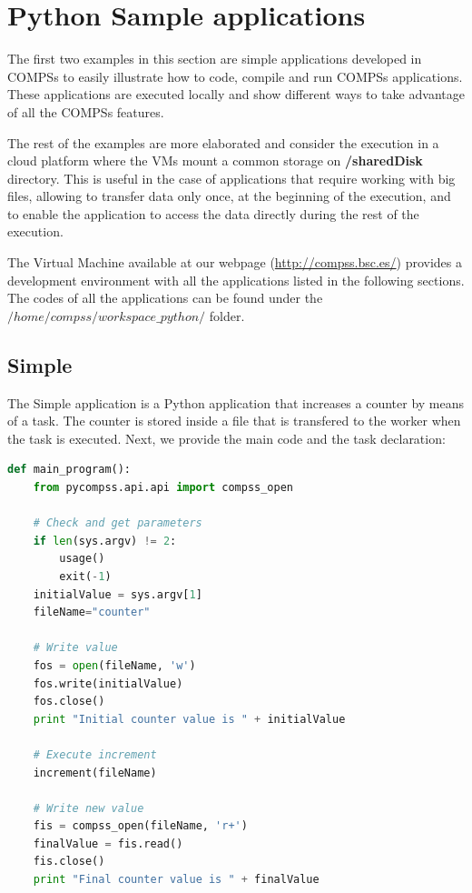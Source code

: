 \section{Python Sample applications}
\label{sec:PythonSampleApps}

The first two examples in this section are simple applications developed in COMPSs to easily illustrate how to code,
compile and run COMPSs applications. These applications are executed locally and show different ways to take advantage
of all the COMPSs features. 

The rest of the examples are more elaborated and consider the execution in a cloud platform where the VMs mount a common 
storage on \textbf{/sharedDisk} directory. This is useful in the case of applications that require working 
with big files, allowing to transfer data only once, at the beginning of the execution, and to enable 
the application to access the data directly during the rest of the execution.

The Virtual Machine available at our webpage (\url{http://compss.bsc.es/}) provides a development environment with
all the applications listed in the following sections. The codes of all the applications can be found under the 
$/home/compss/workspace\_python/$ folder. 

\subsection{Simple}
The Simple application is a Python application that increases a counter by means of a task. The counter is stored inside a file that 
is transfered to the worker when the task is executed. Next, we provide the main code and the task declaration:

\begin{lstlisting}[language=python]
def main_program():
    from pycompss.api.api import compss_open

    # Check and get parameters
    if len(sys.argv) != 2:
        usage()
        exit(-1)
    initialValue = sys.argv[1]
    fileName="counter"

    # Write value
    fos = open(fileName, 'w')
    fos.write(initialValue)
    fos.close()
    print "Initial counter value is " + initialValue

    # Execute increment
    increment(fileName)

    # Write new value
    fis = compss_open(fileName, 'r+')
    finalValue = fis.read()
    fis.close()
    print "Final counter value is " + finalValue
\end{lstlisting}

